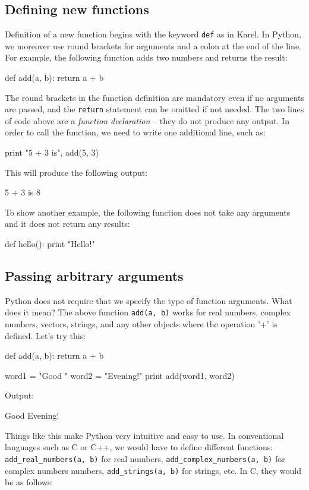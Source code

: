 \subsection{Defining new functions}

Definition of a new function begins with the keyword {\tt def} as in Karel. In Python,
we moreover use round brackets for arguments and a colon at the end of the line. 
For example, the following function adds two numbers
and returns the result:

\begin{bluecode}
def add(a, b):
    return a + b
\end{bluecode}
The round brackets in the function definition are mandatory even if no arguments are passed,
and the {\tt return} statement can be omitted if not needed.
The two lines of code above 
are a {\em function declaration} -- they do not produce any output.
In order to call the function, we need to write one additional line, such as:

\begin{bluecode}
print "5 + 3 is", add(5, 3)
\end{bluecode}
This will produce the following output:

\begin{greencode}
5 + 3 is 8
\end{greencode}
To show another example, the following function does not take any arguments 
and it does not return any results:

\begin{bluecode}
def hello():
    print "Hello!"
\end{bluecode}

\subsection{Passing arbitrary arguments}

Python does not require that we specify the type of function arguments. 
What does it mean? The above function {\tt add(a, b)} works for real
numbers, complex numbers, vectors, strings, and any other 
objects where the operation '+' is defined. Let's try this:

\begin{bluecode}
def add(a, b):
    return a + b

word1 = "Good "
word2 = "Evening!"
print add(word1, word2)
\end{bluecode}
Output:

\begin{greencode}
Good Evening!
\end{greencode}
Things like this make Python very intuitive and easy to use. In conventional languages such as C or C++, 
we would have to define different functions: {\tt add\_real\_numbers(a, b)} for real numbers,
{\tt add\_complex\_numbers(a, b)} for complex numbers numbers, {\tt add\_strings(a, b)} for strings, etc. 
In C, they would be as follows:

